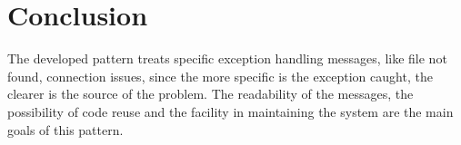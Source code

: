 \documentclass[12pt]{article}
\begin{document}
\begin{flushleft}








 \end{flushleft}
 

\section{Conclusion}

The developed pattern treats specific exception handling messages, like file not found, connection issues, since the more specific is the exception caught, the clearer is the source of the problem. The readability of the messages, the possibility of code reuse and the facility in maintaining the system are the main goals of this pattern.



\newpage




\end{document}
